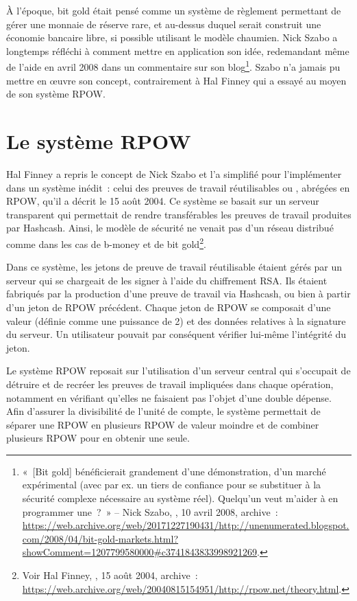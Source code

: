 À l'époque, bit gold était pensé comme un système de règlement permettant de gérer une monnaie de réserve rare, et au-dessus duquel serait construit une économie bancaire libre, si possible utilisant le modèle chaumien. Nick Szabo a longtemps réfléchi à comment mettre en application son idée, redemandant même de l'aide en avril 2008 dans un commentaire sur son blog\footnote{«~[Bit gold] bénéficierait grandement d'une démonstration, d'un marché expérimental (avec par ex. un tiers de confiance pour se substituer à la sécurité complexe nécessaire au système réel). Quelqu'un veut m'aider à en programmer une~?~» -- Nick Szabo, , 10 avril 2008, archive~: \url{https://web.archive.org/web/20171227190431/http://unenumerated.blogspot.com/2008/04/bit-gold-markets.html?showComment=1207799580000\#c3741843833998921269}.}. Szabo n'a jamais pu mettre en œuvre son concept, contrairement à Hal Finney qui a essayé au moyen de son système RPOW.

\section*{Le système RPOW} %

Hal Finney a repris le concept de Nick Szabo et l'a simplifié pour l'implémenter dans un système inédit~: celui des preuves de travail réutilisables ou , abrégées en RPOW, qu'il a décrit le 15 août 2004. Ce système se basait sur un serveur transparent qui permettait de rendre transférables les preuves de travail produites par Hashcash. Ainsi, le modèle de sécurité ne venait pas d'un réseau distribué comme dans les cas de b-money et de bit gold\footnote{Voir Hal Finney, , 15 août 2004, archive~: \url{https://web.archive.org/web/20040815154951/http://rpow.net/theory.html}.}.

Dans ce système, les jetons de preuve de travail réutilisable étaient gérés par un serveur qui se chargeait de les signer à l'aide du chiffrement RSA. Ils étaient fabriqués par la production d'une preuve de travail via Hashcash, ou bien à partir d'un jeton de RPOW précédent. Chaque jeton de RPOW se composait d'une valeur (définie comme une puissance de 2) et des données relatives à la signature du serveur. Un utilisateur pouvait par conséquent vérifier lui-même l'intégrité du jeton.

Le système RPOW reposait sur l'utilisation d'un serveur central qui s'occupait de détruire et de recréer les preuves de travail impliquées dans chaque opération, notamment en vérifiant qu'elles ne faisaient pas l'objet d'une double dépense. Afin d'assurer la divisibilité de l'unité de compte, le système permettait de séparer une RPOW en plusieurs RPOW de valeur moindre et de combiner plusieurs RPOW pour en obtenir une seule.

